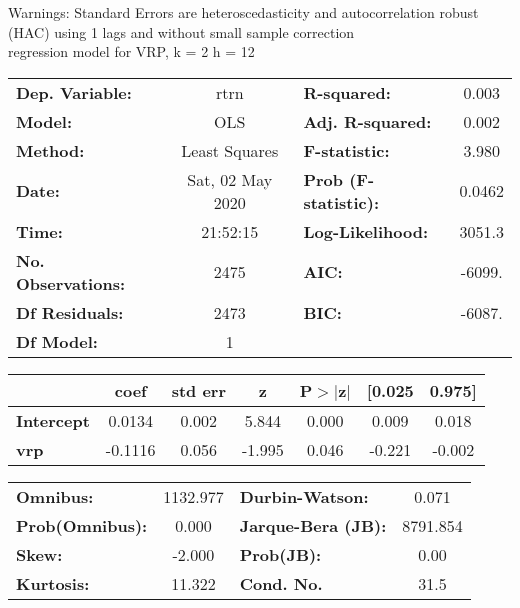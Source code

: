 Warnings: \newline
 [1] Standard Errors are heteroscedasticity and autocorrelation robust (HAC) using 1 lags and without small sample correction\\ 

regression model for VRP, k = 2 h = 12\begin{center}
\begin{tabular}{lclc}
\toprule
\textbf{Dep. Variable:}    &       rtrn       & \textbf{  R-squared:         } &     0.003   \\
\textbf{Model:}            &       OLS        & \textbf{  Adj. R-squared:    } &     0.002   \\
\textbf{Method:}           &  Least Squares   & \textbf{  F-statistic:       } &     3.980   \\
\textbf{Date:}             & Sat, 02 May 2020 & \textbf{  Prob (F-statistic):} &   0.0462    \\
\textbf{Time:}             &     21:52:15     & \textbf{  Log-Likelihood:    } &    3051.3   \\
\textbf{No. Observations:} &        2475      & \textbf{  AIC:               } &    -6099.   \\
\textbf{Df Residuals:}     &        2473      & \textbf{  BIC:               } &    -6087.   \\
\textbf{Df Model:}         &           1      & \textbf{                     } &             \\
\bottomrule
\end{tabular}
\begin{tabular}{lcccccc}
                   & \textbf{coef} & \textbf{std err} & \textbf{z} & \textbf{P$> |$z$|$} & \textbf{[0.025} & \textbf{0.975]}  \\
\midrule
\textbf{Intercept} &       0.0134  &        0.002     &     5.844  &         0.000        &        0.009    &        0.018     \\
\textbf{vrp}       &      -0.1116  &        0.056     &    -1.995  &         0.046        &       -0.221    &       -0.002     \\
\bottomrule
\end{tabular}
\begin{tabular}{lclc}
\textbf{Omnibus:}       & 1132.977 & \textbf{  Durbin-Watson:     } &    0.071  \\
\textbf{Prob(Omnibus):} &   0.000  & \textbf{  Jarque-Bera (JB):  } & 8791.854  \\
\textbf{Skew:}          &  -2.000  & \textbf{  Prob(JB):          } &     0.00  \\
\textbf{Kurtosis:}      &  11.322  & \textbf{  Cond. No.          } &     31.5  \\
\bottomrule
\end{tabular}
\end{center}

